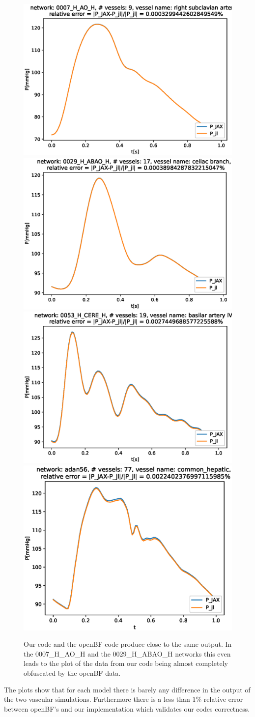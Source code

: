 \documentclass[a4paper, oneside]{discothesis}
\begin{document}
						\begin{figure} [!ht]
							\centering
							\includegraphics[width=0.4\columnwidth]{figures/0007_H_AO_H_right_subclavian_artery_P.eps}
							\includegraphics[width=0.4\columnwidth]{figures/0029_H_ABAO_H_celiac_branch_P.eps
							}
							\includegraphics[width=0.4\columnwidth]{figures/0053_H_CERE_H_basilar_artery_IV_P.eps}
							\includegraphics[width=0.4\columnwidth]{figures/adan56_common_hepatic_P.eps}
							\caption{Our code and the openBF code produce close to the same output. In the 0007\_H\_AO\_H and the 0029\_H\_ABAO\_H networks this even leads to the plot of the data from our code being almost completely obfuscated by the openBF data.}
							\label{fig:val}
\end{figure}
The plots show that for each model there is barely any difference in the output of the two vascular simulations.
Furthermore there is a less than $1\%$ relative error between openBF's and our implementation which validates our codes correctness.
\end{document}
